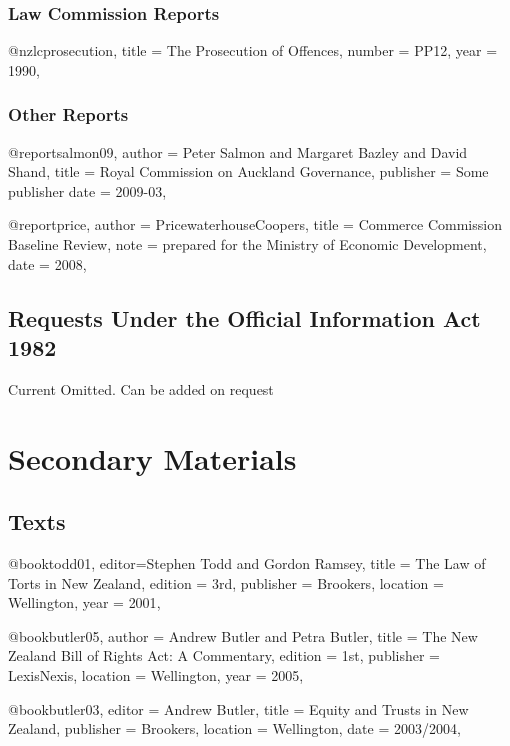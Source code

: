 \documentclass{book}
\begin{document}
\subsection{Law Commission Reports}
\begin{bib}
@nzlc{prosecution,
title = {The Prosecution of Offences},
number = {PP12},
year = {1990},
}
\end{bib}

\subsection{Other Reports}
\begin{bib}
@report{salmon09,
author = {Peter Salmon and Margaret Bazley and David Shand},
title  = {Royal Commission on Auckland Governance},
publisher = {Some publisher}
date = {2009-03},
}
\end{bib}
\begin{bib}
@report{price,
author = {PricewaterhouseCoopers},
title = {Commerce Commission Baseline Review},
note = {prepared for the Ministry of Economic Development},
date = {2008},
}
\end{bib}

\section{Requests Under the Official Information Act 1982}

Current Omitted. Can be added on request

\chapter{Secondary Materials}

\section{Texts}
\begin{bib}
@book{todd01,
editor={Stephen Todd and Gordon Ramsey},
title = {The Law of Torts in New Zealand},
edition = {3rd},
publisher = {Brookers},
location = {Wellington},
year = {2001},
}
\end{bib}
\begin{bib}
@book{butler05,
author = {Andrew Butler and Petra Butler},
title = {The New Zealand Bill of Rights Act: A Commentary},
edition = {1st},
publisher = {LexisNexis},
location = {Wellington},
year = {2005},
}
\end{bib}
\begin{bib}
@book{butler03,
editor = {Andrew Butler},
title = {Equity and Trusts in New Zealand},
publisher = {Brookers},
location = {Wellington},
date = {2003/2004},
}
\end{bib}
\end{document}
